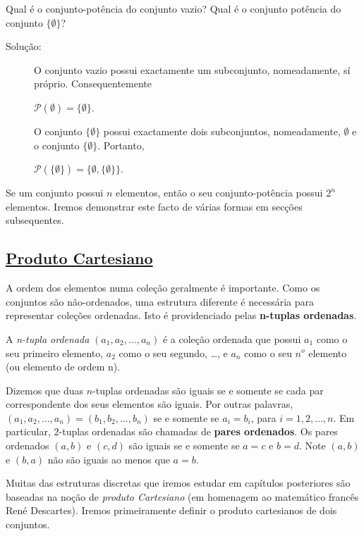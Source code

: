 \begin{exmp}
\label{exem39}
Qual é o conjunto-potência do conjunto vazio? Qual é o conjunto potência do
conjunto $\{\emptyset\}$?

\begin{description}
\item[Solução:]O conjunto vazio possui exactamente um subconjunto, nomeadamente,
sí próprio. Consequentemente
\begin{center}
$\mathcal{P}(\emptyset) = \{\emptyset\}$.
\end{center}
O conjunto $\{\emptyset\}$ possui exactamente dois subconjuntos, nomeadamente,
$\emptyset$ e o conjunto $\{\emptyset\}$. Portanto,
\begin{center}
$\mathcal{P}(\{\emptyset\}) = \{\emptyset, \{\emptyset\}\}$.
\end{center}
\end{description}
\end{exmp}
Se um conjunto possui $n$ elementos, então o seu conjunto-potência possui $2^n$
elementos. Iremos demonstrar este facto de várias formas em secções
subsequentes.

\subsection*{\underline{Produto Cartesiano}}

A ordem dos elementos numa coleção geralmente é importante. Como os conjuntos
são não-ordenados, uma estrutura diferente é necessária para representar
coleções ordenadas. Isto é providenciado pelas \textbf{n-tuplas ordenadas}.

\begin{defn}
\label{def37}
A \emph{n-tupla ordenada} $(a_1, a_2, \ldots, a_n)$ é a coleção ordenada que
possui $a_1$ como o seu primeiro elemento, $a_2$ como o seu segundo, \ldots, e
$a_n$ como o seu $n^o$ elemento (ou elemento de ordem n).
\end{defn} 

Dizemos que duas $n$-tuplas ordenadas são iguais se e somente se cada par
correspondente dos seus elementos são iguais. Por outras palavras, $(a_1, a_2,
\ldots,a_n) = (b_1, b_2, \ldots, b_n)$ se e somente se $a_i = b_i$, para
$i=1,2,\ldots,n$. Em particular, 2-tuplas ordenadas são chamadas de
\textbf{pares ordenados}. Os pares ordenados $(a,b)$ e $(c,d)$ são iguais se e
somente se $a = c$ e $b = d$. Note $(a, b)$  e $(b,a)$ não são iguais ao menos
que $a = b$.

Muitas das estruturas discretas que iremos estudar em capítulos posteriores são
baseadas na noção de \emph{produto Cartesiano} (em homenagem ao matemático
francês René Descartes). Iremos primeiramente definir o produto cartesianos de
dois conjuntos.

